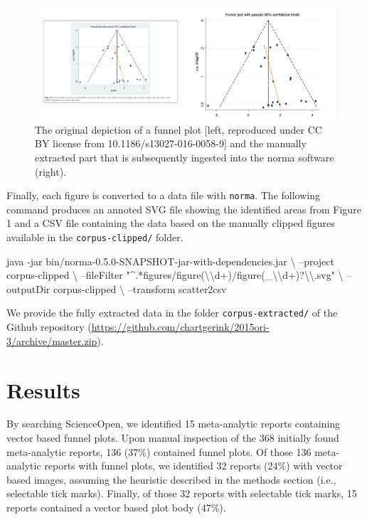 \documentclass[a5paper]{book}
\newenvironment{Shaded}{\begin{snugshade}}{\end{snugshade}}
\newcommand{\DataTypeTok}[1]{\textcolor[rgb]{0.13,0.29,0.53}{#1}}
\newcommand{\StringTok}[1]{\textcolor[rgb]{0.31,0.60,0.02}{#1}}
\newcommand{\ExtensionTok}[1]{#1}
\newcommand{\NormalTok}[1]{#1}
\begin{document}
\begin{figure}[h]
\includegraphics[width=1\linewidth]{assets/figures/boxed-funnel} \caption{The original depiction of a funnel plot [left, reproduced under CC BY license from 10.1186/s13027-016-0058-9] and the manually extracted part that is subsequently ingested into the norma software (right).}\label{fig:vector-fig4}
\end{figure}

Finally, each figure is converted to a data file with \texttt{norma}.
The following command produces an annoted SVG file showing the
identified areas from Figure 1 and a CSV file containing the data based
on the manually clipped figures available in the
\texttt{corpus-clipped/} folder.

\begin{Shaded}
\begin{Highlighting}[]
\ExtensionTok{java}\NormalTok{ -jar bin/norma-0.5.0-SNAPSHOT-jar-with-dependencies.jar \textbackslash{}}
\NormalTok{  --project corpus-clipped \textbackslash{}}
\NormalTok{  --fileFilter }\StringTok{"^.*figures/figure(}\DataTypeTok{\textbackslash{}\textbackslash{}}\StringTok{d+)/figure(_}\DataTypeTok{\textbackslash{}\textbackslash{}}\StringTok{d+)?}\DataTypeTok{\textbackslash{}\textbackslash{}}\StringTok{.svg"}\NormalTok{ \textbackslash{}}
\NormalTok{  --outputDir corpus-clipped \textbackslash{}}
\NormalTok{  --transform scatter2csv}
\end{Highlighting}
\end{Shaded}

We provide the fully extracted data in the folder
\texttt{corpus-extracted/} of the Github repository
(\url{https://github.com/chartgerink/2015ori-3/archive/master.zip}).

\section{Results}\label{results-5}

By searching ScienceOpen, we identified 15 meta-analytic reports
containing vector based funnel plots. Upon manual inspection of the 368
initially found meta-analytic reports, 136 (37\%) contained funnel
plots. Of those 136 meta-analytic reports with funnel plots, we
identified 32 reports (24\%) with vector based images, assuming the
heuristic described in the methods section (i.e., selectable tick
marks). Finally, of those 32 reports with selectable tick marks, 15
reports contained a vector based plot body (47\%).
\end{document}
